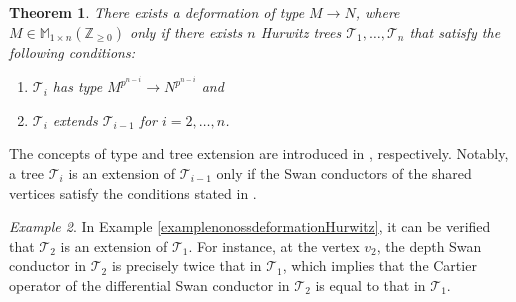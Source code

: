 \documentclass{compositio}
\newtheorem{theorem}{Theorem}[section]
\theoremstyle{remark}
\newtheorem{example}[theorem]{Example}
\theoremstyle{remark}
\begin{document}
\begin{theorem}
    There exists a deformation of type $M \xrightarrow{} N$, where $M \in \mathbb{M}_{1 \times n}(\mathbb{Z}_{\ge 0})$ only if there exists $n$ Hurwitz trees $\mathcal{T}_1, \ldots, \mathcal{T}_n$ that satisfy the following conditions:
    \begin{enumerate}
        \item $\mathcal{T}_i$ has type $M^{p^{n-i}} \xrightarrow{} N^{p^{n-i}}$ and
        \item $\mathcal{T}_i$ extends $\mathcal{T}_{i-1}$ for $i=2, \ldots, n$.
    \end{enumerate}
\end{theorem}
The concepts of type and tree extension are introduced in \cite[Definition 4.2 and Definition 4.6]{2020arXiv201013614D}, respectively. Notably, a tree $\mathcal{T}_i$ is an extension of $\mathcal{T}_{i-1}$ only if the Swan conductors of the shared vertices satisfy the conditions stated in \cite[Theorem 3.4.2]{2020arXiv201013614D}.


\begin{example}
In Example \ref{examplenonossdeformationHurwitz}, it can be verified that $\mathcal{T}_2$ is an extension of $\mathcal{T}_1$. For instance, at the vertex $v_2$, the depth Swan conductor in $\mathcal{T}_2$ is precisely twice that in $\mathcal{T}_1$, which implies that the Cartier operator of the differential Swan conductor in $\mathcal{T}_2$ is equal to that in $\mathcal{T}_1$.
\end{example}
\end{document}
